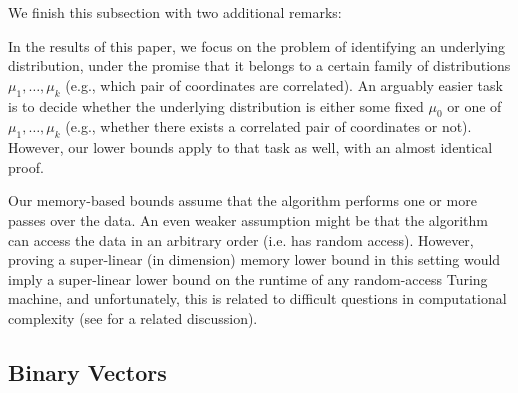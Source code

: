 
We finish this subsection with two additional remarks:
\begin{remark} \label{remark:id-vs-binary}
In the results of this paper, we focus on the problem of identifying an underlying distribution, under the promise that it belongs to a certain family of distributions $\mu_1,\ldots,\mu_k$ (e.g., which pair of coordinates are correlated). An arguably easier task is to decide whether the underlying distribution is either some fixed $\mu_0$ or one of $\mu_1,\ldots,\mu_k$ (e.g., whether there exists a correlated pair of coordinates or not). However, our lower bounds apply to that task as well, with an almost identical proof. 
\end{remark}%
\begin{remark} \label{remark:data-access}
	Our memory-based bounds assume that the algorithm performs one or more 
	passes over the data. An even weaker assumption might be that the algorithm 
	can access the data in an arbitrary order (i.e. has random access). 
	However, proving a super-linear (in dimension) memory lower bound in this 
	setting would imply a super-linear lower bound on the runtime of any 		random-access Turing machine, and unfortunately, this is related to difficult questions in computational complexity (see \citet[Section 1.2]{raz2016fast} for a related discussion).
\end{remark}

\subsection{Binary Vectors}\label{subsec:binary}

